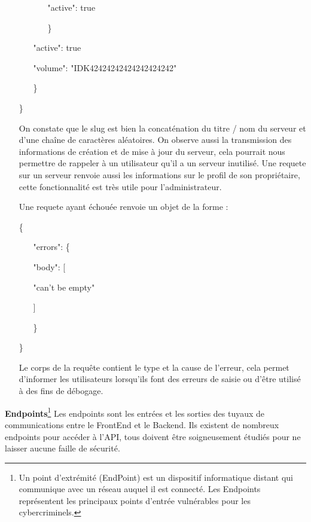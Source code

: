 \documentclass{article}
\begin{document}
\begin{itemize}
\begin{itemize}
\begin{itemize}
					\item[]"active": true
				\item[\}]
			\end{itemize}
			\item[]"active": true
			\item[]"volume": "IDK42424242424242424242"
		\item[\}]
	\end{itemize}
	\item[\}]
	\item[]On constate que le slug est bien la concaténation du titre / nom du serveur et d'une chaîne de caractères aléatoires. On observe aussi la transmission des informations de création et de mise à jour du serveur, cela pourrait nous permettre de rappeler à un utilisateur qu'il a un serveur inutilisé. Une requete sur un serveur renvoie aussi les informations sur le profil de son propriétaire, cette fonctionnalité est très utile pour l'administrateur.
	\item[]
	\item[]Une requete ayant échouée renvoie un objet de la forme :
	\item[\{]
	\item[]
	\begin{itemize}
		\item["errors": \{]
			\item["body":][
			\item[]"can't be empty"
			\item[]]
		\item[\}]
	\end{itemize}
	\item[\}]
	\item[]Le corps de la requête contient le type et la cause de l'erreur, cela permet d'informer les utilisateurs lorsqu'ils font des erreurs de saisie ou d'être utilisé à des fins de débogage.
\end{itemize}
\newpage
\textbf{Endpoints}\footnote{\label{EndPoints}Un point d'extrémité (EndPoint) est un dispositif informatique distant qui communique avec un réseau auquel il est connecté. Les Endpoints représentent les principaux points d'entrée vulnérables pour les cybercriminels.}
\newline
\newline
Les endpoints sont les entrées et les sorties des tuyaux de communications entre le FrontEnd et le Backend. Ils existent de nombreux endpoints pour accéder à l'API, tous doivent être soigneusement étudiés pour ne laisser aucune faille de sécurité.
\end{document}
